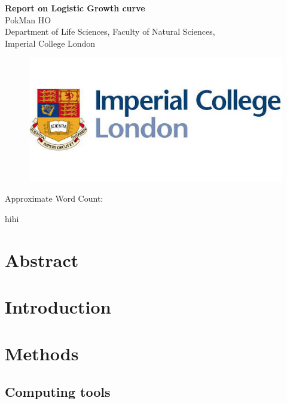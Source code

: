 \documentclass[a4paper, 11pt]{article}
\title{\ReportTitle}
\author{\ReportAuthor (CID: 01786076)}
\date{}
\newcommand{\ReportTitle}{Report on Logistic Growth curve} %
\newcommand{\ReportAuthor}{PokMan HO}
\newcommand{\ReportAffil}{Department of Life Sciences, Faculty of Natural Sciences,\\Imperial College London}
\begin{document}
	\begin{center}
		\Huge\textbf{\ReportTitle}\\
		\LARGE\ReportAuthor\\
		\Large\ReportAffil
	\end{center}
	\begin{figure}[h]
		\centering\includegraphics[width=\linewidth]{icl.jpg}
	\end{figure}
	\begin{flushright}
		\Large Approximate Word Count: %
	\end{flushright}
	\clearpage
	
	\maketitle
	hihi\autocite{zwietering1994modeling}
	\section*{Abstract}
	\section*{Introduction}
	\section*{Methods}
	\subsection*{Computing tools}
\end{document}

